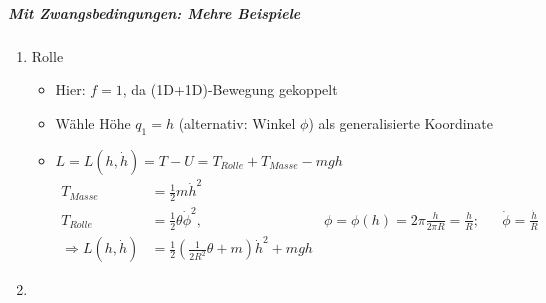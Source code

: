 \subparagraph{Mit Zwangsbedingungen: Mehre Beispiele}
\begin{enumerate}

\item\label{item:8} Rolle


\begin{itemize}
\item Hier: $f=1$, da (1D+1D)-Bewegung gekoppelt
\item Wähle Höhe $q_1=h$ (alternativ: Winkel $\phi$) als
  generalisierte Koordinate
\item $L = L (h,\dot{h}) = T-U = T_{Rolle}+T_{Masse}-mgh$
\begin{align*}
  T_{Masse} &= \frac{1}{2}m\dot{h}^2\\
  T_{Rolle} &= \frac{1}{2}\theta\dot{\phi}^2,
            &\phi = \phi(h) = 2\pi \frac{h}{2\pi R} = \frac{h}{R};
            &&\dot{\phi}= \frac{\dot{h}}{R}\\
  \Rightarrow
  L(h,\dot{h}) &= \frac{1}{2}\left( \frac{1}{2R^2}\theta + m \right)\dot{h}^2 + mgh
\end{align*}

\end{itemize}

\item\label{item:7} 

\end{enumerate}



